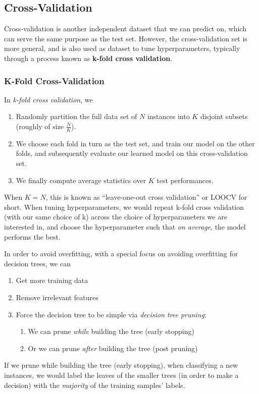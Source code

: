 \documentclass[11 pt]{scrartcl}
\begin{document}
\subsection{Cross-Validation}
Cross-validation is another independent dataset that we can predict on, which can serve the same purpose as the test set. However, the cross-validation set is more general, and is also used as dataset to tune hyperparameters, typically through a process known as \textbf{k-fold cross validation}.
\newpage
\subsubsection{K-Fold Cross-Validation}
\begin{definition}
In \emph{k-fold cross validation}, we
\begin{enumerate}
  \item Randomly partition the full data set of $N$ instances into $K$ disjoint subsets (roughly of size $\frac{N}{K}$).
  \item We choose each fold in turn as the test set, and train our model on the other folds, and subsequently evaluate our learned model on this cross-validation set.
  \item We finally compute average statistics over $K$ test performances. 
\end{enumerate}
When $K = N$, this is known as ``leave-one-out cross validation'' or LOOCV for short. When tuning hyperparameters, we would repeat k-fold cross validation (with our same choice of k) across the choice of hyperparameters we are interested in, and choose the hyperparameter such that \textit{on average}, the model performs the best. 
\end{definition}
In order to avoid overfitting, with a special focus on avoiding overfitting for decision trees, we can
\begin{enumerate}
  \item Get more training data
  \item Remove irrelevant features
  \item Force the decision tree to be simple via \textit{decision tree pruning}:
    \begin{enumerate}
      \item We can prune \textit{while} building the tree (early stopping) 
      \item Or we can prune \textit{after} building the tree (post pruning)
    \end{enumerate}
\end{enumerate}
If we prune while building the tree (early stopping), when classifying a new instances, we would label the leaves of the smaller trees (in order to make a decision) with the \textit{majority} of the training samples' labels.
\end{document}
